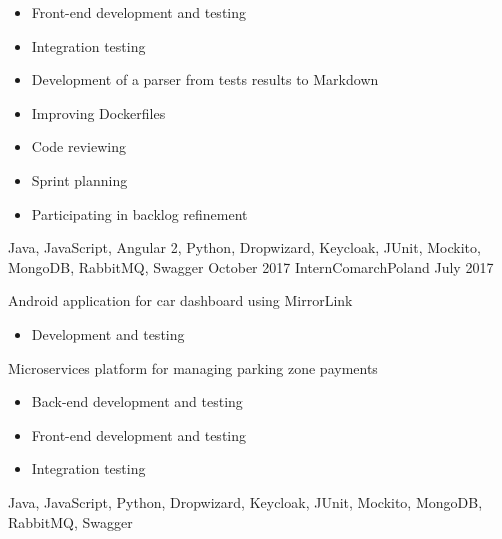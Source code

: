 \begin{experiences}
{\begin{itemize}
                            \item Front-end development and testing
                            \item Integration testing
                            \item Development of a parser from tests results to Markdown
                            \item Improving Dockerfiles
                            \item Code reviewing
                            \item Sprint planning
                            \item Participating in backlog refinement
                        \end{itemize}
                    }
                    {Java, JavaScript, Angular 2, Python, Dropwizard, Keycloak, JUnit, Mockito, MongoDB, RabbitMQ, Swagger}
  \emptySeparator
  \experience
  {October 2017}       {Intern}{Comarch}{Poland}
  {July 2017}      {
                        Android application for car dashboard using MirrorLink
                        \begin{itemize}
                            \item Development and testing
                        \end{itemize}
                        Microservices platform for managing parking zone payments
                        \begin{itemize}
                            \item Back-end development and testing
                            \item Front-end development and testing
                            \item Integration testing
                        \end{itemize}
                    }
                    {Java, JavaScript, Python, Dropwizard, Keycloak, JUnit, Mockito, MongoDB, RabbitMQ, Swagger}
\end{experiences}
